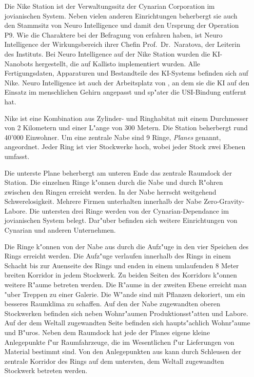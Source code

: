 
Die Nike Station ist der Verwaltungssitz der Cynarian Corporation im jovianischen System. Neben vielen anderen Einrichtungen beherbergt sie auch den Stammsitz von Neuro Intelligence und damit den Ursprung der Operation P9. Wie die Charaktere bei der Befragung von \ml{} erfahren haben, ist Neuro Intelligence der Wirkungsbereich ihrer Chefin Prof.~Dr.~Naratova, der Leiterin des Instituts. Bei Neuro Intelligence auf der Nike Station wurden die KI-Nanobots hergestellt, die auf Kallisto implementiert wurden. Alle Fertigungsdaten, Apparaturen und Bestandteile des KI-Systems befinden sich auf Nike. Neuro Intelligence ist auch der Arbeitsplatz von \ml{}, an dem sie die KI auf den Einsatz im menschlichen Gehirn angepasst und sp"ater die USI-Bindung entfernt hat.

Nike ist eine Kombination aus Zylinder- und Ringhabitat mit einem Durchmesser von 2 Kilometern und einer L"ange von 300 Metern. Die Station beherbergt rund 40'000 Einwohner. Um eine zentrale Nabe sind 9 Ringe, \emph{Planes} genannt, angeordnet. Jeder Ring ist vier Stockwerke hoch, wobei jeder Stock zwei Ebenen umfasst. 

Die unterste Plane beherbergt am unteren Ende das zentrale Raumdock der Station. Die einzelnen Ringe k"onnen durch die Nabe und durch R"ohren zwischen den Ringen erreicht werden. In der Nabe herrscht weitgehend Schwerelosigkeit. Mehrere Firmen unterhalten innerhalb der Nabe Zero-Gravity-Labore. Die untersten drei Ringe werden von der Cynarian-Dependance im jovianischen System belegt. Dar"uber befinden sich weitere Einrichtungen von Cynarian und anderen Unternehmen.

Die Ringe k"onnen von der Nabe aus durch die Aufz"uge in den vier Speichen des Rings erreicht werden. Die Aufz"uge verlaufen innerhalb des Rings in einem Schacht bis zur Au\3enseite des Rings und enden in einem umlaufenden 8 Meter breiten Korridor in jedem Stockwerk. Zu beiden Seiten des Korridors k"onnen weitere R"aume betreten werden. Die R"aume in der zweiten Ebene erreicht man "uber Treppen zu einer Galerie. Die W"ande sind mit Pflanzen dekoriert, um ein besseres Raumklima zu schaffen. Auf den der Nabe zugewandten oberen Stockwerken befinden sich neben Wohnr"aumen Produktionsst"atten und Labore. Auf der dem Weltall zugewandten Seite befinden sich haupts"achlich Wohnr"aume und B"uros. Neben dem Raumdock hat jede der Planes eigene kleine Anlegepunkte f"ur Raumfahrzeuge, die im Wesentlichen f"ur Lieferungen von Material bestimmt sind. Von den Anlegepunkten aus kann durch Schleusen der zentrale Korridor des Rings auf dem untersten, dem Weltall zugewandten Stockwerk betreten werden.

